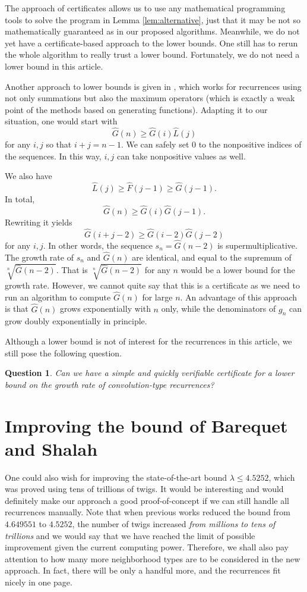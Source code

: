 \documentclass[a4paper,12pt]{article}
\newtheorem{question}{Question}
\begin{document}
The approach of certificates allows us to use any mathematical programming tools to solve the program in Lemma \ref{lem:alternative}, just that it may be not so mathematically guaranteed as in our proposed algorithms. Meanwhile, we do not yet have a certificate-based approach to the lower bounds. One still has to rerun the whole algorithm to really trust a lower bound. Fortunately, we do not need a lower bound in this article.

Another approach to lower bounds is given in \cite{bui2024mixed}, which works for recurrences using not only summations but also the maximum operators (which is exactly a weak point of the methods based on generating functions). Adapting it to our situation, one would start with
\[
    \hat{G}(n)\ge \hat{G}(i)\hat{L}(j)
\]
for any $i,j$ so that $i+j=n-1$. We can safely set $0$ to the nonpositive indices of the sequences. In this way, $i,j$ can take nonpositive values as well. 

We also have
\[
    \hat{L}(j)\ge \hat{F}(j-1)\ge \hat{G}(j-1).
\]
In total,
\[
    \hat{G}(n)\ge \hat{G}(i)\hat{G}(j-1).
\]
Rewriting it yields
\[
    \hat{G}(i+j-2)\ge \hat{G}(i-2)\hat{G}(j-2)
\]
for any $i,j$.
In other words, the sequence $s_n=\hat{G}(n-2)$ is supermultiplicative. The growth rate of $s_n$ and $\hat{G}(n)$ are identical, and equal to the supremum of $\sqrt[n]{\hat{G}(n-2)}$. That is $\sqrt[n]{\hat{G}(n-2)}$ for any $n$ would be a lower bound for the growth rate. However, we cannot quite say that this is a certificate as we need to run an algorithm to compute $\hat{G}(n)$ for large $n$. An advantage of this approach is that $\hat{G}(n)$ grows exponentially with $n$ only, while the denominators of $g_n$ can grow doubly exponentially in principle.

Although a lower bound is not of interest for the recurrences in this article, we still pose the following question.
\begin{question}
    Can we have a simple and quickly verifiable certificate for a lower bound on the growth rate of convolution-type recurrences?
\end{question}

\section{Improving the bound of Barequet and Shalah}
\label{sec:barequet-shalah}
One could also wish for improving the state-of-the-art bound $\lambda\le 4.5252$, which was proved using tens of trillions of twigs. It would be interesting and would definitely make our approach a good proof-of-concept if we can still handle all recurrences manually. Note that when previous works reduced the bound from $4.649551$ to $4.5252$, the number of twigs increased \emph{from millions to tens of trillions} and we would say that we have reached the limit of possible improvement given the current computing power. Therefore, we shall also pay attention to how many more neighborhood types are to be considered in the new approach. In fact, there will be only a handful more, and the recurrences fit nicely in one page.
\end{document}

